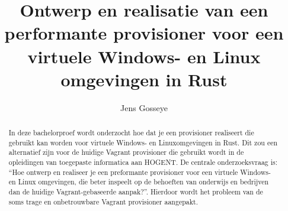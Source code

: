 \documentclass{hogent-article}
\title{Ontwerp en realisatie van een performante provisioner voor een virtuele Windows- en Linux omgevingen in Rust}
\author{Jens Gosseye}
\begin{document}
\begin{abstract}
    In deze bachelorproef wordt onderzocht hoe dat je een provisioner realiseert die gebruikt kan worden voor virtuele Windows- en Linuxomgevingen in Rust. Dit zou een alternatief zijn voor de huidige Vagrant provisioner die gebruikt wordt in de opleidingen van toegepaste informatica aan HOGENT. De centrale onderzoeksvraag is: ``Hoe ontwerp en realiseer je een preformante provisioner voor een virtuele Windows- en Linux omgevingen, die beter inspeelt op de behoeften van onderwijs en bedrijven dan de huidige Vagrant-gebaseerde aanpak?''. Hierdoor wordt het probleem van de soms trage en onbetrouwbare Vagrant provisioner aangepakt.
\end{abstract}

\tableofcontents



\printbibliography[heading=bibintoc]
\end{document}
